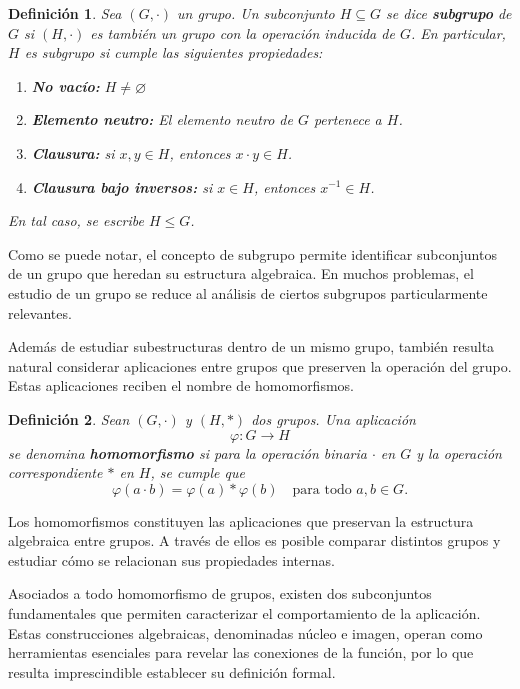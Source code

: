 \documentclass[11pt,a4paper,spanish]{report}
\theoremstyle{plain}
\newtheorem{definicion}{Definición}[chapter]
\begin{document}
\begin{definicion}\cite{dummit2004abstract}\label{def:subgrupo}
Sea $(G,\cdot)$ un grupo.  
Un subconjunto $H\subseteq G$ se dice \textbf{subgrupo} de $G$ si $(H,\cdot)$ es también un grupo con la operación inducida de $G$.  
En particular, $H$ es subgrupo si cumple las siguientes propiedades:
\begin{enumerate}
    \item[(i)] \textbf{No vacío:} $H\neq\varnothing$
    \item[(ii)] \textbf{Elemento neutro:} El elemento neutro de $G$ pertenece a $H$.
    \item[(iii)] \textbf{Clausura:} si $x,y\in H$, entonces $x\cdot y\in H$.
    \item[(iv)] \textbf{Clausura bajo inversos:} si $x\in H$, entonces $x^{-1}\in H$.
\end{enumerate}
En tal caso, se escribe $H\leq G$.
\end{definicion}
Como se puede notar, el concepto de subgrupo permite identificar subconjuntos de un grupo que heredan su 
estructura algebraica. En muchos problemas, el estudio de un grupo se reduce al análisis 
de ciertos subgrupos particularmente relevantes. 

Además de estudiar subestructuras dentro de un mismo grupo, también resulta natural 
considerar aplicaciones entre grupos que preserven la operación del grupo. 
Estas aplicaciones reciben el nombre de homomorfismos.

\begin{definicion}\cite{doerr2013applied}
Sean $(G, \cdot)$ y $(H, *)$ dos grupos.
Una aplicación 
\[
\varphi : G \longrightarrow H
\]
se denomina \textbf{homomorfismo} si 
para la operación binaria $\cdot$ en $G$ y la operación correspondiente $*$ en $H$, se cumple que
\[
\varphi(a\cdot b) = \varphi(a) * \varphi(b)
\quad \text{para todo } a,b \in G.
\]
\end{definicion}
Los homomorfismos constituyen las aplicaciones que preservan la estructura 
algebraica entre grupos. A trav\'es de ellos es posible comparar distintos 
grupos y estudiar c\'omo se relacionan sus propiedades internas.

Asociados a todo homomorfismo de grupos, existen dos subconjuntos fundamentales que permiten caracterizar el comportamiento de la aplicación. Estas construcciones algebraicas, denominadas núcleo e imagen, operan como herramientas esenciales para revelar las conexiones de la función, por lo que resulta imprescindible establecer su definición formal.
\end{document}
